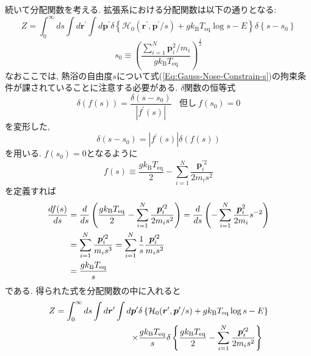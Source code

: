 続いて分配関数を考える. 拡張系における分配関数は以下の通りとなる:
\begin{equation}
    Z
    =
    \int_{0}^{\infty}ds
    \int d\bm{r}^{\prime}
    \int d\bm{p}^{\prime}
    \delta
    \left\{
        \mathcal{H}_{0}(\bm{r}^{\prime}, \bm{p}^{\prime}/s)
        +
        g k_{\mathrm{B}} T_{\mathrm{eq}} \log s
        -
        E
    \right\}
    \delta
    \left\{s - s_{0}\right\}
\end{equation}
\begin{equation}
    s_{0} \equiv
    \left(
        \frac
        {\sum_{i=1}^{N} \bm{p}_{i}^{2} / m_{i}}
        {g k_{\mathrm{B}} T_{\mathrm{eq}}}
    \right)^{\frac{1}{2}}
\end{equation}
なおここでは, 熱浴の自由度$s$について式(\ref{Eq:Gauss-Nose-Constrain-s})の拘束条件が課されていることに注意する必要がある.
$\delta$関数の恒等式
\begin{equation}
    \delta(f(s))
    =
    \frac{\delta (s - s_{0})}{|f^{\prime}(s)|}
    ~~~~
    \mathrm{但し}~ f(s_{0}) = 0
\end{equation}
を変形した,
\begin{equation}
    \delta(s - s_{0})
    =
    |f^{\prime}(s)| \delta(f(s))
\end{equation}
を用いる. $f(s_{0}) = 0$となるように
\begin{equation}
    f(s)
    \equiv
    \frac{g k_{\mathrm{B}} T_{\mathrm{eq}}}{2}
    -
    \sum_{i=1}^{N}
    \frac{\bm{p}_{i}^{\prime 2}}{2 m_{i} s^{2}}
\end{equation}
を定義すれば
\begin{align}
    \frac{d f(s)}{ds}
    &=
    \frac{d}{ds}
    \left(
        \frac{g k_{\mathrm{B}} T_{\mathrm{eq}}}{2}
        -
        \sum_{i=1}^{N}
        \frac{\bm{p}_{i}^{\prime 2}}{2 m_{i} s^{2}}
    \right)
    =
    \frac{d}{ds}
    \left(
        - \sum_{i=1}^{N}
        \frac{\bm{p}_{i}^{2}}{2m_{i}} s^{-2}
    \right)
    \notag \\
    &=
    \sum_{i=1}^{N}
    \frac{\bm{p}_{i}^{\prime 2}}{m_{i}s^{3}}
    =
    \sum_{i=1}^{N}
    \frac{1}{s}
    \frac{\bm{p}_{i}^{\prime 2}}{m_{i}s^{2}}
    \notag \\
    &=
    \frac{g k_{\mathrm{B}} T_{\mathrm{eq}}}{s}
\end{align}
である. 得られた式を分配関数の中に入れると
\begin{align}
    Z
    =
    \int_{0}^{\infty}ds
    \int d\bm{r}^{\prime}
    \int d\bm{p}^{\prime}
    &
    \delta
    \left\{
        \mathcal{H}_{0}(\bm{r}^{\prime}, \bm{p}^{\prime}/s)
        +
        g k_{\mathrm{B}} T_{\mathrm{eq}} \log s
        -
        E
    \right\}
    \notag \\
    \times
    &
    \frac{g k_{\mathrm{B}} T_{\mathrm{eq}}}{s}
    \delta
    \left\{
        \frac{g k_{\mathrm{B}} T_{\mathrm{eq}}}{2}
        -
        \sum_{i=1}^{N}
        \frac{\bm{p}_{i}^{\prime 2}}{2 m_{i} s^{2}}
    \right\}
\end{align}
